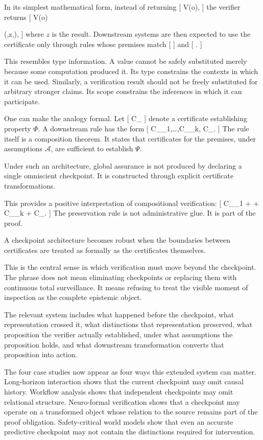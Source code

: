 \documentclass[11pt]{article}
\begin{document}
In its simplest mathematical form, instead of returning
[
V(o),
]
the verifier returns
[
V(o)

(\Phi,z,),
]
where $z$ is the result. Downstream systems are then expected to use the certificate only through rules whose premises match
[
\Phi
]
and
[
.
]

This resembles type information. A value cannot be safely substituted merely because some computation produced it. Its type constrains the contexts in which it can be used. Similarly, a verification result should not be freely substituted for arbitrary stronger claims. Its scope constrains the inferences in which it can participate.

One can make the analogy formal. Let
[
C_\Phi
]
denote a certificate establishing property $\Phi$. A downstream rule has the form
[
C_{\Phi_1},\ldots,C_{\Phi_k},
\vdash
C_\Psi.
]
The rule itself is a composition theorem. It states that certificates for the premises, under assumptions $\mathcal{A}$, are sufficient to establish $\Psi$.

Under such an architecture, global assurance is not produced by declaring a single omniscient checkpoint. It is constructed through explicit certificate transformations.

This provides a positive interpretation of compositional verification:
[
C_{\Phi_1}
+
\cdots
+
C_{\Phi_k}
+
\Longrightarrow
C_\Psi.
]
The preservation rule is not administrative glue. It is part of the proof.

A checkpoint architecture becomes robust when the boundaries between certificates are treated as formally as the certificates themselves.

This is the central sense in which verification must move beyond the checkpoint. The phrase does not mean eliminating checkpoints or replacing them with continuous total surveillance. It means refusing to treat the visible moment of inspection as the complete epistemic object.

The relevant system includes what happened before the checkpoint, what representation crossed it, what distinctions that representation preserved, what proposition the verifier actually established, under what assumptions the proposition holds, and what downstream transformation converts that proposition into action.

The four case studies now appear as four ways this extended system can matter. Long-horizon interaction shows that the current checkpoint may omit causal history. Workflow analysis shows that independent checkpoints may omit relational structure. Neuro-formal verification shows that a checkpoint may operate on a transformed object whose relation to the source remains part of the proof obligation. Safety-critical world models show that even an accurate predictive checkpoint may not contain the distinctions required for intervention.
\end{document}

